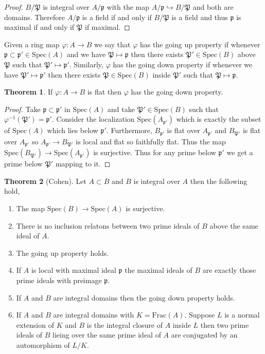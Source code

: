 \documentclass[12pt]{article}
\newcommand{\Frac}[1]{\mathrm{Frac}\left(#1\right)}
\newcommand{\spec}[1]{\mathrm{Spec}\left( #1 \right)}
\newcommand{\p}{\mathfrak{p}}
\theoremstyle{remark}
\theoremstyle{definition}
\newtheorem{theorem}{Theorem}[section]
\newenvironment{definition}[1][Definition:]{\begin{trivlist}
\item[\hskip \labelsep {\bfseries #1}]}{\end{trivlist}}
\begin{document}
\begin{proof}
$B / \mathfrak{P}$ is integral over $A / \p$ with the map $A / \p \hookrightarrow B / \mathfrak{P}$ and both are domains. Therefore $A / \p$ is a field if and only if $B / \mathfrak{P}$ is a field and thus $\p$ is maximal if and only if $\mathfrak{P}$ if maximal. 
\end{proof}

\begin{definition}
Given a ring map $\varphi : A \to B$ we say that $\varphi$ has the going up property if whenever $\p \subset \p' \in \spec{A}$ and we have $\mathfrak{P} \mapsto \p$ then there exists $\mathfrak{P}' \in \spec{B}$ above $\mathfrak{P}$ such that $\mathfrak{P}' \mapsto \p'$. Similarly, $\varphi$ has the going down property if whenever we have $\mathfrak{P}' \mapsto \p'$ then there exists $\mathfrak{P} \in \spec{B}$ inside $\mathfrak{P}'$ such that $\mathfrak{P} \mapsto \p$. 
\end{definition}

\begin{theorem}
If $\varphi : A \to B$ is flat then $\varphi$ has the going down property. 
\end{theorem}

\begin{proof}
Take $\p \subset \p'$ in $\spec{A}$ and take $\mathfrak{P}' \in \spec{B}$ such that $\varphi^{-1}(\mathfrak{P}') = \p'$. Consider the localization $\spec{A_{\p'}}$ which is exactly the subset of $\spec{A}$ which lies below $\p'$. Furthermore, $B_{\p'}$ is flat over $A_{\p'}$ and $B_{\mathfrak{P}'}$ is flat over $A_{\p'}$ so $A_{\p'} \to B_{\mathfrak{P}'}$ is local and flat so faithfully flat. Thus the map $\spec{B_{\mathfrak{P}'}} \to \spec{A_{\p'}}$ is surjective. Thus for any prime below $\p'$ we get a prime below $\mathfrak{P}'$ mapping to it. 
\end{proof}

\begin{theorem}[Cohen]
Let $A \subset B$ and $B$ is integral over $A$ then the following hold,
\begin{enumerate}
\item The map $\spec{B} \to \spec{A}$ is surjective.
\item There is no inclusion relatons between two prime ideals of $B$ above the same ideal of $A$. 
\item The going up property holds. 
\item If $A$ is local with maximal ideal $\p$ the maximal ideals of $B$ are exactly those prime ideals with preimage $\p$. 
\item If $A$ and $B$ are integral domains then the going down property holds.  
\item If $A$ and $B$ are integral domains with $K = \Frac{A}$. Suppose $L$ is a normal extension of $K$ and $B$ is the integral closure of $A$ inside $L$ then two prime ideals of $B$ lieing over the same prime ideal of $A$ are conjugated by an automorphism of $L / K$.  
\end{enumerate}
\end{theorem}
\end{document}
